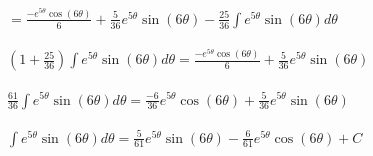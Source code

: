 \documentclass{article}
\begin{document}
{$ = \frac{-e^{5\theta}\cos(6\theta)}{6} + \frac{5}{36}e^{5\theta}\sin(6\theta) - \frac{25}{36}\int{e^{5\theta}\sin(6\theta)} d\theta $\\\\

$ (1+\frac{25}{36})\int{e^{5\theta}\sin(6\theta)} d\theta = \frac{-e^{5\theta}\cos(6\theta)}{6} + \frac{5}{36}e^{5\theta}\sin(6\theta) $\\\\

$ \frac{61}{36}\int{e^{5\theta}\sin(6\theta)} d\theta = \frac{-6}{36}e^{5\theta}\cos(6\theta) + \frac{5}{36}e^{5\theta}\sin(6\theta) $\\\\

$ \int{e^{5\theta}\sin(6\theta)} d\theta = \frac{5}{61}e^{5\theta}\sin(6\theta) - \frac{6}{61}e^{5\theta}\cos(6\theta) + C $\\

}
\end{document}
